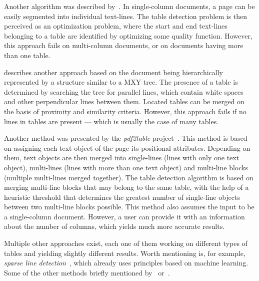 Another algorithm was described by~\citet{MediumTable}. In single-column documents, a page can be easily segmented into individual text-lines. The table detection problem is then perceived as an optimization problem, where the start and end text-lines belonging to a table are identified by optimizing some quality function. However, this approach fails on multi-column documents, or on documents having more than one table.

\citet{tableDetectCesarini} describes another approach based on the document being hierarchically represented by a structure similar to a MXY tree. The presence of a table is determined by searching the tree for parallel lines, which contain white spaces and other perpendicular lines between them. Located tables can be merged on the basis of proximity and similarity criteria. However, this approach fails if no lines in tables are present --- which is usually the case of many tables.

Another method was presented by the \emph{pdf2table} project~\cite{pdf2table}. This method is based on assigning each text object of the page its positional attributes. Depending on them, text objects are then merged into single-lines (lines with only one text object), multi-lines (lines with more than one text object) and multi-line blocks (multiple multi-lines merged together). The table detection algorithm is based on merging multi-line blocks that may belong to the same table, with the help of a heuristic threshold that determines the greatest number of single-line objects between two multi-line blocks possible. This method also assumes the input to be a single-column document. However, a user can provide it with an information about the number of columns, which yields much more accurate results.

Multiple other approaches exist, each one of them working on different types of tables and yielding slightly different results. Worth mentioning is, for example, \emph{sparse line detection}~\cite{sparseLineDetection}, which already uses principles based on machine learning. Some of the other methods briefly mentioned by~\citet{otherDetection1} or~\citet{otherDetection2}.
